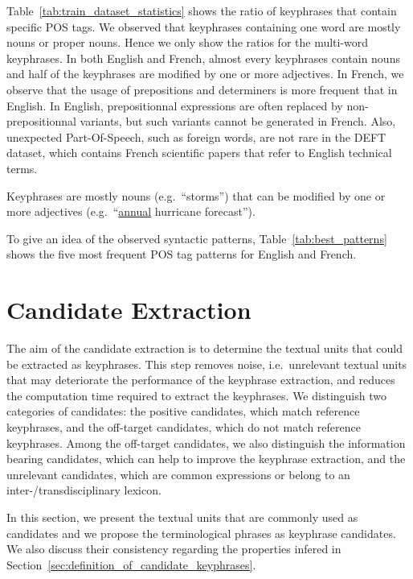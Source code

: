     Table~\ref{tab:train_dataset_statistics} shows the ratio of keyphrases that
    contain specific POS tags. We observed that keyphrases containing one word
    are mostly nouns or proper nouns. Hence we only show the ratios for the
    multi-word keyphrases. In both English and French, almost every keyphrases
    contain nouns and half of the keyphrases are modified by one or more
    adjectives. In French, we observe that the usage of prepositions and
    determiners is more frequent that in English. In English, prepositionnal
    expressions are often replaced by non-prepositionnal variants, but such
    variants cannot be generated in French. Also, unexpected Part-Of-Speech, such
    as foreign words, are not rare in the DEFT dataset, which contains French
    scientific papers that refer to English technical terms.

    \begin{property}\label{prop:noun_phrases}
      Keyphrases are mostly nouns (e.g.~``storms'') that can be modified by one
      or more adjectives (e.g.~``\underline{annual} hurricane forecast'').
    \end{property}

    To give an idea of the observed syntactic patterns,
    Table~\ref{tab:best_patterns} shows the five most frequent POS tag patterns
    for English and French.

\section{Candidate Extraction}
\label{sec:candidate_extraction}
  The aim of the candidate extraction is to determine the textual units that
  could be extracted as keyphrases. This step removes noise, i.e.~unrelevant
  textual units that may deteriorate the performance of the keyphrase
  extraction, and reduces the computation time required to extract the
  keyphrases. We distinguish two categories of candidates: the positive
  candidates, which match reference keyphrases, and the off-target candidates,
  which do not match reference keyphrases. Among the off-target candidates, we
  also distinguish the information bearing candidates, which can help to improve
  the keyphrase extraction, and the unrelevant candidates, which are common
  expressions or belong to an inter-/transdisciplinary lexicon.

  In this section, we present the textual units that are commonly used as
  candidates and we propose the terminological phrases as keyphrase candidates.
  We also discuss their consistency regarding the properties infered in
  Section~\ref{sec:definition_of_candidate_keyphrases}.

